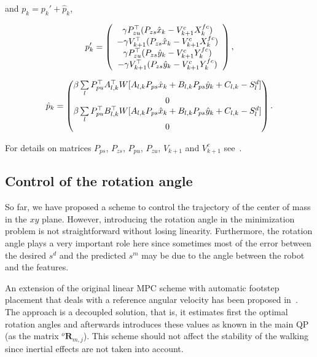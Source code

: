 and $p_k = p_k' + \hat{p}_k$,

\begin{equation*}
 p'_k = 
 \left(
 \begin{array}{c}
 \gamma P^{\top}_{zu}(P_{zs} \hat{x}_k - V_{k+1}^c X_k^{fc}) \\
 -\gamma V^{\top}_{k+1}(P_{zs}\hat{x}_k - V_{k+1}^c X_k^{fc}) \\
 \gamma P^{\top}_{zu}(P_{zs} \hat{y}_k - V_{k+1}^c Y_k^{fc}) \\
 -\gamma V^{\top}_{k+1}(P_{zs}\hat{y}_k - V_{k+1}^c Y_k^{fc})
 \end{array}
 \right),
\end{equation*}

\begin{equation*}
 \hat{p}_k = 
 \left(
 \begin{matrix}
 \beta  \sum\limits_l P_{pu}^{\top} A_{l,k}^{\top} W [A_{l,k} P_{ps} \hat{x}_k + B_{l,k} P_{ps} \hat{y}_k + C_{l,k} - S^d_l]\\
 0 \\
 \beta  \sum\limits_l P_{pu}^{\top} B_{l,k}^{\top} W [A_{l,k} P_{ps} \hat{x}_k + B_{l,k} P_{ps} \hat{y}_k + C_{l,k} - S^d_l ]\\
 0
 \end{matrix}
 \right).
\end{equation*}

For details on matrices $P_{ps}$, $P_{zs}$, $P_{pu}$, $P_{zu}$, $V_{k+1}$ and $V_{k+1}^c$ see~\cite{HerdtAR2010}.

\subsection{Control of the rotation angle}
\label{subsection:control_of_the_rotation_angle}


So far, we have proposed a scheme to control the trajectory of the center of mass in the $xy$ plane. However, introducing the rotation angle in the minimization problem is not straightforward without losing linearity. Furthermore, the rotation angle plays a very important role here since sometimes most of the error between the desired $s^d$ and the predicted $s^m$ may be due to the angle between the robot and the features.

An extension of the original linear MPC scheme with automatic footstep placement that deals with a reference angular velocity has been proposed in~\citep{HerdtIROS2010}. The approach is a decoupled solution, that is, it estimates first the optimal rotation angles and afterwards introduces these values as known in the main QP (as the matrix ${^o \mathbf R_{m,j}}$). This scheme should not affect the stability of the walking since inertial effects are not taken into account.

